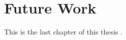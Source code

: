 %
\section{Future Work}\label{sec:future_work}
%
This is the last chapter of this thesis \cite{tur38}.
%

